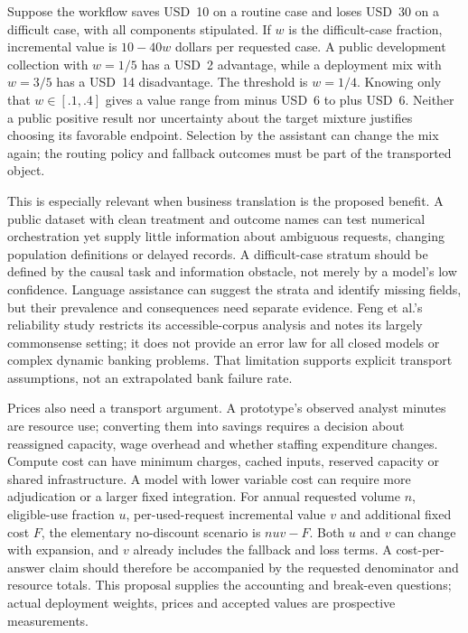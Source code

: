 Suppose the workflow saves USD~10 on a routine case and loses USD~30 on a
difficult case, with all components stipulated. If $w$ is the difficult-case
fraction, incremental value is $10-40w$ dollars per requested case. A public
development collection with $w=1/5$ has a USD~2 advantage, while a deployment
mix with $w=3/5$ has a USD~14 disadvantage. The threshold is $w=1/4$. Knowing
only that $w\in[.1,.4]$ gives a value range from minus USD~6 to plus USD~6.
Neither a public positive result nor uncertainty about the target mixture
justifies choosing its favorable endpoint. Selection by the assistant can
change the mix again; the routing policy and fallback outcomes must be part
of the transported object. \citep{exec14_l8_economics}

This is especially relevant when business translation is the proposed benefit.
A public dataset with clean treatment and outcome names can test numerical
orchestration yet supply little information about ambiguous requests, changing
population definitions or delayed records. A difficult-case stratum should be
defined by the causal task and information obstacle, not merely by a model's
low confidence. Language assistance can suggest the strata and identify missing
fields, but their prevalence and consequences need separate evidence. Feng
et al.'s reliability study restricts its accessible-corpus analysis and notes
its largely commonsense setting; it does not provide an error law for all
closed models or complex dynamic banking problems. That limitation supports
explicit transport assumptions, not an extrapolated bank failure rate.
\citep{v12_la_2407_19638}

Prices also need a transport argument. A prototype's observed analyst minutes
are resource use; converting them into savings requires a decision about
reassigned capacity, wage overhead and whether staffing expenditure changes.
Compute cost can have minimum charges, cached inputs, reserved capacity or
shared infrastructure. A model with lower variable cost can require more
adjudication or a larger fixed integration. For annual requested volume $n$,
eligible-use fraction $u$, per-used-request incremental value $v$ and additional
fixed cost $F$, the elementary no-discount scenario is $nuv-F$. Both $u$ and
$v$ can change with expansion, and $v$ already includes the fallback and loss
terms. A cost-per-answer claim should therefore be accompanied by the requested
denominator and resource totals. This proposal supplies the accounting and
break-even questions; actual deployment weights, prices and accepted values
are prospective measurements. \citep{exec14_l8_design}

